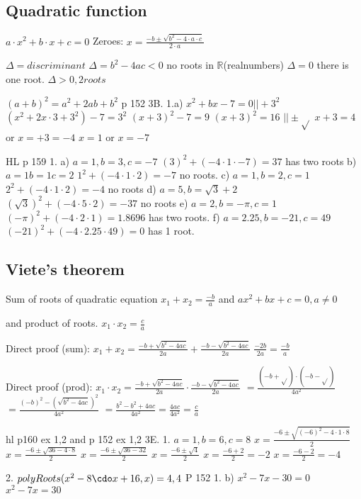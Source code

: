 \subsection{Quadratic function}

$a\cdot x^2+b\cdot x+c=0$
Zeroes:
$x=\frac{-b\pm\sqrt{b^2-4\cdot a\cdot c}}{2\cdot a}$

$\Delta=discriminant$
$\Delta=b^2-4ac<0$ no roots in $\mathbb{R}$(realnumbers)
$\Delta=0$ there is one root.
$\Delta>0, 2 roots$

$(a+b)^2=a^2+2ab+b^2$
p 152 3B. 1.a)
$x^2+bx-7=0 ||+3^2$
$(x^2+2x\cdot 3+3^2)-7=3^2$
$(x+3)^2-7=9$
$(x+3)^2=16$ $||\pm\sqrt{}$
$x+3=4$ or $x=+3=-4$
$x=1$ or $x=-7$

HL p 159
1. a) $a=1, b=3, c=-7$
$(3)^2+(-4\cdot 1\cdot -7)=37$ has two roots 
b) $a=1 b=1 c=2$
$1^2+(-4\cdot 1\cdot 2)=-7$ no roots.
c) $a=1,b=2,c=1$
$2^2+(-4\cdot 1\cdot 2)=-4$ no roots
d) $a=5,b=\sqrt{3}+2$
$(\sqrt{3})^2+(-4\cdot 5\cdot 2)=-37$ no roots
e) $a=2, b=-\pi, c=1$
$(-\pi)^2+(-4\cdot 2\cdot 1)=1.8696$ has two roots.
f) $a=2.25, b=-21, c=49$
$(-21)^2+(-4\cdot 2.25\cdot 49)=0$ has 1 root.

\subsection{Viete's theorem}
Sum of roots of quadratic equation
$x_1+x_2=\frac{-b}{a}$ and $ax^2+bx+c=0, a\neq 0$

and product of roots.
$x_1\cdot x_2=\frac{c}{a}$

Direct proof (sum):
$x_1+x_2=\frac{-b+\sqrt{b^2-4ac}}{2a}+\frac{-b-\sqrt{b^2-4ac}}{2a}$
$\frac{-2b}{2a}=\frac{-b}{a}$

Direct proof (prod):
$x_1\cdot x_2=\frac{-b+\sqrt{b^2-4ac}}{2a}\cdot\frac{-b-\sqrt{b^2-4ac}}{2a}$
$=\frac{(-b+\sqrt{})\cdot (-b-\sqrt{})}{4a^2}$
$=\frac{(-b)^2-(\sqrt{b^2-4ac})^2}{4a^2}$
$=\frac{b^2-b^2+4ac}{4a^2}=\frac{4ac}{4a^2}=\frac{c}{a}$

hl p160 ex 1,2 and p 152 ex 1,2
3E. 1. 
$a=1, b=6, c=8$
$x=\frac{-6\pm\sqrt{(-6)^2-4\cdot 1\cdot 8}}{2}$
$x=\frac{-6\pm\sqrt{36-4\cdot 8}}{2}$ 
$x=\frac{-6\pm\sqrt{36-32}}{2}$
$x=\frac{-6\pm\sqrt{4}}{2}$
$x=\frac{-6+2}{2}=-2$
$x=\frac{-6-2}{2}=-4$

2. $polyRoots(x^2-8\cdo x+16,x)={4,4}$
P 152
1. b) $x^2-7x-30=0$
$x^2-7x=30$

